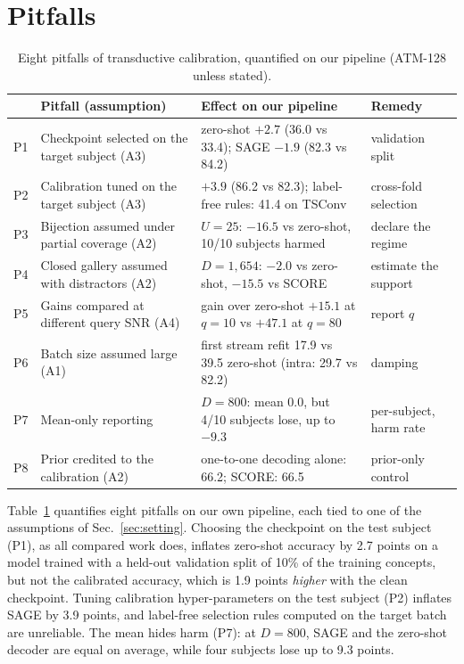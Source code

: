 \documentclass[10pt,twocolumn,letterpaper]{article}
\begin{document}
\section{Pitfalls}
\label{sec:pitfalls}

\begin{table}[t]
\caption{Eight pitfalls of transductive calibration, quantified on our pipeline (ATM-128 unless stated).}
\label{tab:pitfalls}
\centering
\small
\setlength{\tabcolsep}{4pt}
\begin{tabular}{@{}llp{7.6cm}l@{}}
\toprule
 & Pitfall (assumption) & Effect on our pipeline & Remedy \\
\midrule
P1 & Checkpoint selected on the target subject (A3) & zero-shot $+2.7$ (36.0 vs 33.4); SAGE $-1.9$ (82.3 vs 84.2) & validation split \\
P2 & Calibration tuned on the target subject (A3) & $+3.9$ (86.2 vs 82.3); label-free rules: 41.4 on TSConv & cross-fold selection \\
P3 & Bijection assumed under partial coverage (A2) & $U=25$: $-16.5$ vs zero-shot, 10/10 subjects harmed & declare the regime \\
P4 & Closed gallery assumed with distractors (A2) & $D=1{,}654$: $-2.0$ vs zero-shot, $-15.5$ vs SCORE & estimate the support \\
P5 & Gains compared at different query SNR (A4) & gain over zero-shot $+15.1$ at $q=10$ vs $+47.1$ at $q=80$ & report $q$ \\
P6 & Batch size assumed large (A1) & first stream refit 17.9 vs 39.5 zero-shot (intra: 29.7 vs 82.2) & damping \\
P7 & Mean-only reporting & $D=800$: mean $0.0$, but 4/10 subjects lose, up to $-9.3$ & per-subject, harm rate \\
P8 & Prior credited to the calibration (A2) & one-to-one decoding alone: 66.2; SCORE: 66.5 & prior-only control \\
\bottomrule
\end{tabular}
\end{table}

Table~\ref{tab:pitfalls} quantifies eight pitfalls on our own pipeline, each tied to one of the assumptions of Sec.~\ref{sec:setting}. Choosing the checkpoint on the test subject (P1), as all compared work does, inflates zero-shot accuracy by 2.7 points on a model trained with a held-out validation split of 10\% of the training concepts, but not the calibrated accuracy, which is 1.9 points \emph{higher} with the clean checkpoint. Tuning calibration hyper-parameters on the test subject (P2) inflates SAGE by 3.9 points, and label-free selection rules computed on the target batch are unreliable. The mean hides harm (P7): at $D=800$, SAGE and the zero-shot decoder are equal on average, while four subjects lose up to 9.3 points.
\end{document}
